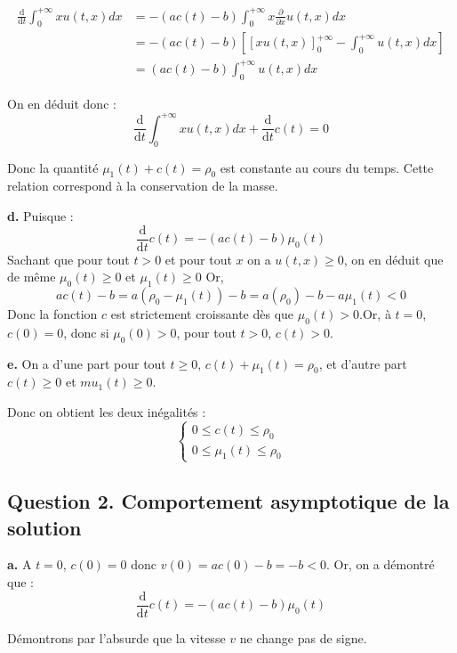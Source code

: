 \documentclass[a4paper]{article}
\begin{document}
\[	
\begin{split}
\displaystyle \frac{\mathrm{d}}{\mathrm{d} t} \int_0^{+\infty} x u(t,x)dx
	                        &= - (ac(t)-b)\int_0^{+\infty}
							x\frac{\partial}{\partial x}u(t,x)dx\\
							&= - (ac(t)-b) [
							[xu(t,x)]_0^{+\infty} 
							- \int_0^{+\infty} u(t,x)dx]\\
							& = (ac(t)-b) \int_0^{+\infty} u(t,x)dx
\end{split}
\]

On en déduit donc :
\[ \displaystyle \frac{\mathrm{d}}{\mathrm{d} t} \int_0^{+\infty} x u(t,x)dx
+ \frac{\mathrm{d}}{\mathrm{d} t} c(t) = 0 \]

Donc la quantité $\mu_1(t) +c(t) = \rho_0$ est constante au cours du temps.
Cette relation correspond à la conservation de la masse.

\textbf{d.} 
	Puisque :
	\[\displaystyle \frac{\mathrm{d}}{\mathrm{d} t} c(t) = -(ac(t)-b)\mu_0(t)\]
	Sachant que pour tout $t>0$ et pour tout $x$ on a $u(t,x)\geq 0$,
	on en déduit que de même $\mu_0(t) \geq 0$ et $\mu_1(t)\geq 0$
	Or, 
	\[ ac(t)-b = a(\rho_0 - \mu_1(t))-b = a(\rho_0)-b - a\mu_1(t) <0 \]
	Donc la fonction $c$ est strictement croissante dès que $\mu_0(t)>0$.Or, à $t=0$,   $c(0)=0$,
	donc si $\mu_0(0)>0$, pour tout $t>0$, $c(t)> 0$.

\textbf{e.}
On a d'une part pour tout $t\geq 0$, $c(t)+\mu_1(t) = \rho_0$, et d'autre part $c(t)\geq 0$ et $mu_1(t)\geq 0$.

Donc on obtient les deux inégalités :
\[
\begin{cases}
	0 \leq c(t) \leq \rho_0 \\
	0 \leq \mu_1(t) \leq \rho_0
\end{cases}
\]


\subsection*{Question 2. Comportement asymptotique de la solution}

\textbf{a.}
A $t=0$, $c(0) = 0$ donc $v(0) = ac(0) -b = -b <0$.
Or, on a démontré que :
\[\displaystyle \frac{\mathrm{d}}{\mathrm{d} t} c(t) = -(ac(t)-b)\mu_0(t)\]

Démontrons par l'absurde que la vitesse $v$ ne change pas de signe.
\end{document}
